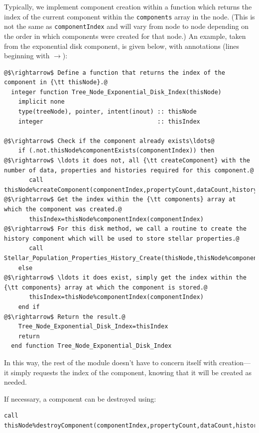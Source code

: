 Typically, we implement component creation within a function which returns the index of the current component within the {\tt components} array in the node. (This is not the same as {\tt componentIndex} and will vary from node to node depending on the order in which components were created for that node.) An example, taken from the exponential disk component, is given below, with annotations (lines beginning with $\rightarrow$):
\begin{lstlisting}[escapechar=@,breaklines,prebreak=\&,postbreak=\&]
@$\rightarrow$ Define a function that returns the index of the component in {\tt thisNode}.@
  integer function Tree_Node_Exponential_Disk_Index(thisNode)
    implicit none
    type(treeNode), pointer, intent(inout) :: thisNode
    integer                                :: thisIndex
    
@$\rightarrow$ Check if the component already exists\ldots@
    if (.not.thisNode%componentExists(componentIndex)) then
@$\rightarrow$ \ldots it does not, all {\tt createComponent} with the number of data, properties and histories required for this component.@
       call thisNode%createComponent(componentIndex,propertyCount,dataCount,historyCount)
@$\rightarrow$ Get the index within the {\tt components} array at which the component was created.@
       thisIndex=thisNode%componentIndex(componentIndex)
@$\rightarrow$ For this disk method, we call a routine to create the history component which will be used to store stellar properties.@
       call Stellar_Population_Properties_History_Create(thisNode,thisNode%components(thisIndex)%histories(stellarHistoryIndex))
    else
@$\rightarrow$ \ldots it does exist, simply get the index within the {\tt components} array at which the component is stored.@
       thisIndex=thisNode%componentIndex(componentIndex)
    end if
@$\rightarrow$ Return the result.@
    Tree_Node_Exponential_Disk_Index=thisIndex
    return
  end function Tree_Node_Exponential_Disk_Index
\end{lstlisting}
In this way, the rest of the module doesn't have to concern itself with creation---it simply requests the index of the component, knowing that it will be created as needed.

If necessary, a component can be destroyed using:
\begin{lstlisting}[escapechar=@,breaklines,prebreak=\&,postbreak=\&]
       call thisNode%destroyComponent(componentIndex,propertyCount,dataCount,historyCount)
\end{lstlisting}


